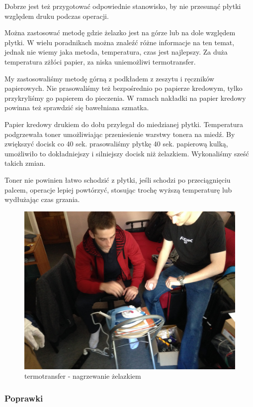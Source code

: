 \documentclass[a4paper,11pt]{article}
\def\SCALE{0.6}
\begin{document}
Dobrze jest też przygotować odpowiednie stanowisko, by nie przesunąć płytki względem druku podczas operacji.

Można zastosować metodę gdzie żelazko jest na górze lub na dole względem płytki. W wielu poradnikach można znaleźć różne informacje na ten temat, jednak nie wiemy jaka metoda, temperatura, czas jest najlepszy. Za duża temperatura zżłóci papier, za niska uniemożliwi termotransfer.

My zastosowaliśmy metodę górną z podkładem z zeszytu i ręczników papierowych. Nie prasowaliśmy też bezpośrednio po papierze kredowym, tylko przykryliśmy go papierem do pieczenia. W ramach nakładki na papier kredowy powinna też sprawdzić się bawełniana szmatka.

Papier kredowy drukiem do dołu przylegał do miedzianej płytki. Temperatura podgrzewała toner umożliwiając przeniesienie warstwy tonera na miedź. By zwiększyć docisk co 40 sek. prasowaliśmy płytkę 40 sek. papierową kulką, umożliwiło to dokładniejszy i silniejszy docisk niż żelazkiem. Wykonaliśmy sześć takich zmian.

Toner nie powinien łatwo schodzić z płytki, jeśli schodzi po przeciągnięciu palcem, operacje lepiej powtórzyć, stosując trochę wyższą temperaturę lub wydłużając czas grzania.
\begin{figure}[H]
	\centering
	\includegraphics[width=\SCALE
	\paperwidth]{termotransfer-1}
	\caption{termotransfer - nagrzewanie żelazkiem}
\end{figure}

\subsubsection{Poprawki}
\end{document}
